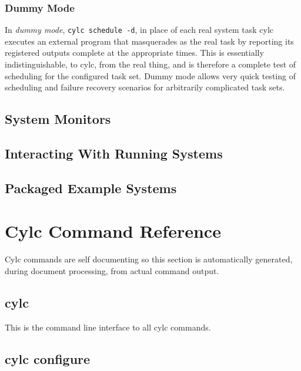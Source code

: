 \documentclass[11pt,a4paper]{article}
\begin{document}
\label{sec:dummymode}
\subsubsection{Dummy Mode}

In {\em dummy mode}, \verb=cylc schedule -d=, in place of each real
system task cylc executes an external program that masquerades as the
real task by reporting its registered outputs complete at the appropriate
times. This is essentially indistinguishable, to cylc, from the real
thing, and is therefore a complete test of scheduling for the configured
task set. Dummy mode allows very quick testing of scheduling and failure
recovery scenarios for arbitrarily complicated task sets.


\subsection{System Monitors}

\subsection{Interacting With Running Systems}

\subsection{Packaged Example Systems}

\pagebreak
\section{Cylc Command Reference}

\lstset{
language=,
xleftmargin=2em,
basicstyle=\footnotesize\ttfamily
}

Cylc commands are self documenting so this section is automatically
generated, during document processing, from actual command output.

\subsection{cylc}

This is the command line interface to all cylc commands.

{
\color{Brown}

}

\pagebreak
\subsection{cylc configure}
\end{document}

